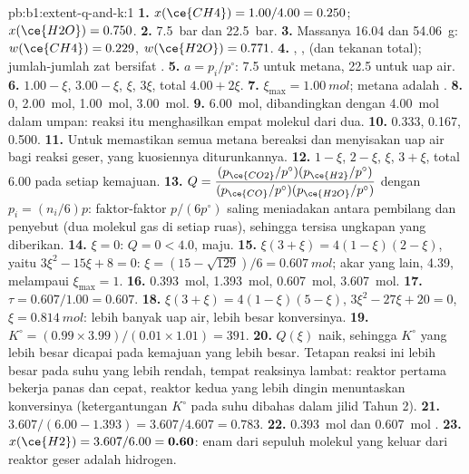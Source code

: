 \begin{solution}{pb:b1:extent-q-and-k:1}
\textbf{1.} $x(\ce{CH4}) = 1.00/4.00 = 0.250$; $x(\ce{H2O}) = 0.750$.
\textbf{2.} \qty{7.5}{bar} dan \qty{22.5}{bar}.
\textbf{3.} Massanya 16.04 dan \qty{54.06}{g}: $w(\ce{CH4}) = 0.229$,
$w(\ce{H2O}) = 0.771$.
\textbf{4.} , ,  (dan tekanan
total); jumlah-jumlah zat bersifat .
\textbf{5.} $a = p_i/p^\circ$: 7.5 untuk metana, 22.5 untuk uap air.
\textbf{6.}  $1.00 - \xi$,  $3.00 - \xi$,  $\xi$,
 $3\xi$, total $4.00 + 2\xi$.
\textbf{7.} $\xi_{\max} = \qty{1.00}{mol}$; metana adalah .
\textbf{8.}  0,  \qty{2.00}{mol},  \qty{1.00}{mol},
 \qty{3.00}{mol}.
\textbf{9.} \qty{6.00}{mol}, dibandingkan dengan \qty{4.00}{mol} dalam
umpan: reaksi itu menghasilkan empat molekul dari dua.
\textbf{10.}  0.333,  0.167,  0.500.
\textbf{11.} Untuk memastikan semua metana bereaksi dan menyisakan uap
air bagi reaksi geser, yang kuosiennya diturunkannya.
\textbf{12.}  $1 - \xi$,  $2 - \xi$,  $\xi$, 
$3 + \xi$, total 6.00 pada setiap kemajuan.
\textbf{13.} $Q = \dfrac{(p_{\ce{CO2}}/p^\circ)(p_{\ce{H2}}/p^\circ)}
{(p_{\ce{CO}}/p^\circ)(p_{\ce{H2O}}/p^\circ)}$ dengan $p_i = (n_i/6)p$:
faktor-faktor $p/(6p^\circ)$ saling meniadakan antara pembilang dan
penyebut (dua molekul gas di setiap ruas), sehingga tersisa ungkapan
yang diberikan.
\textbf{14.} $\xi = 0$: $Q = 0 < 4.0$, maju.
\textbf{15.} $\xi(3 + \xi) = 4(1 - \xi)(2 - \xi)$, yaitu $3\xi^2 - 15\xi +
8 = 0$: $\xi = (15 - \sqrt{129})/6 = \qty{0.607}{mol}$; akar yang lain,
4.39, melampaui $\xi_{\max} = 1$.
\textbf{16.}  \qty{0.393}{mol},  \qty{1.393}{mol},
 \qty{0.607}{mol},  \qty{3.607}{mol}.
\textbf{17.} $\tau = 0.607/1.00 = 0.607$.
\textbf{18.} $\xi(3 + \xi) = 4(1 - \xi)(5 - \xi)$, $3\xi^2 - 27\xi + 20 =
0$, $\xi = \qty{0.814}{mol}$: lebih banyak uap air, lebih besar
konversinya.
\textbf{19.} $K^\circ = (0.99 \times 3.99)/(0.01 \times 1.01) = 391$.
\textbf{20.} $Q(\xi)$ naik, sehingga $K^\circ$ yang lebih besar dicapai
pada kemajuan yang lebih besar. Tetapan reaksi ini lebih besar pada suhu
yang lebih rendah, tempat reaksinya lambat: reaktor pertama bekerja panas
dan cepat, reaktor kedua yang lebih dingin menuntaskan konversinya
(ketergantungan $K^\circ$ pada suhu dibahas dalam jilid Tahun 2).
\textbf{21.} $3.607/(6.00 - 1.393) = 3.607/4.607 = 0.783$.
\textbf{22.} \qty{0.393}{mol}  dan \qty{0.607}{mol} .
\textbf{23.} $x(\ce{H2}) = 3.607/6.00 = \textbf{0.60}$: enam dari sepuluh
molekul yang keluar dari reaktor geser adalah hidrogen.
\end{solution}
